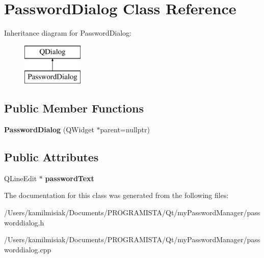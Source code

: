 \hypertarget{class_password_dialog}{}\section{Password\+Dialog Class Reference}
\label{class_password_dialog}
Inheritance diagram for Password\+Dialog\+:\begin{figure}[H]
\begin{center}
\leavevmode
\includegraphics[height=2.000000cm]{class_password_dialog}
\end{center}
\end{figure}
\subsection*{Public Member Functions}
\begin{DoxyCompactItemize}
\item 
\mbox{\label{class_password_dialog_a42792febdfd0d6b59951f7aaa3e531c8}} 
{\bfseries Password\+Dialog} (Q\+Widget $\ast$parent=nullptr)
\end{DoxyCompactItemize}
\subsection*{Public Attributes}
\begin{DoxyCompactItemize}
\item 
\mbox{\label{class_password_dialog_a80693d280abcbb567c6d935cd787dbc9}} 
Q\+Line\+Edit $\ast$ {\bfseries password\+Text}
\end{DoxyCompactItemize}


The documentation for this class was generated from the following files\+:\begin{DoxyCompactItemize}
\item 
/\+Users/kamilmisiak/\+Documents/\+P\+R\+O\+G\+R\+A\+M\+I\+S\+T\+A/\+Qt/my\+Password\+Manager/passworddialog.\+h\item 
/\+Users/kamilmisiak/\+Documents/\+P\+R\+O\+G\+R\+A\+M\+I\+S\+T\+A/\+Qt/my\+Password\+Manager/passworddialog.\+cpp\end{DoxyCompactItemize}
